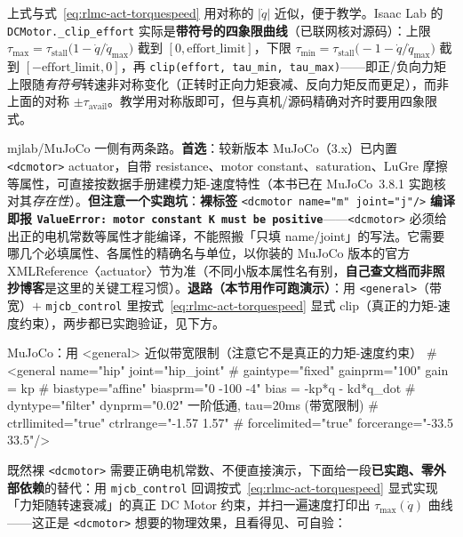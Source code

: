 \noindent{}上式与式~\eqref{eq:rlmc-act-torquespeed} 用对称的 $|\dot q|$ 近似，便于教学。Isaac Lab 的 \verb|DCMotor._clip_effort| 实际是\textbf{带符号的四象限曲线}（已联网核对源码）：上限 $\tau_{\max}=\tau_{\mathrm{stall}}\big(1-\dot q/\dot q_{\max}\big)$ 截到 $[0,\text{effort\_limit}]$，下限 $\tau_{\min}=\tau_{\mathrm{stall}}\big(-1-\dot q/\dot q_{\max}\big)$ 截到 $[-\text{effort\_limit},0]$，再 \verb|clip(effort, tau_min, tau_max)|——即正/负向力矩上限随\emph{有符号}转速非对称变化（正转时正向力矩衰减、反向力矩反而更足），而非上面的对称 $\pm\tau_{\mathrm{avail}}$。教学用对称版即可，但与真机/源码精确对齐时要用四象限式。

mjlab/MuJoCo 一侧有两条路。\textbf{首选}：较新版本 MuJoCo（3.x）已内置 \verb|<dcmotor>| actuator，自带 resistance、motor constant、saturation、LuGre 摩擦等属性，可直接按数据手册建模力矩-速度特性（本书已在 MuJoCo~3.8.1 实跑核对其\emph{存在性}）。\textbf{但注意一个实跑坑}：\textbf{裸标签} \verb|<dcmotor name="m" joint="j"/>| \textbf{编译即报 \texttt{ValueError: motor constant K must be positive}}——\verb|<dcmotor>| 必须给出正的电机常数等属性才能编译，不能照搬「只填 name/joint」的写法。它需要哪几个必填属性、各属性的精确名与单位，以你装的 MuJoCo 版本的官方 XMLReference〈actuator〉节为准（不同小版本属性名有别，\textbf{自己查文档而非照抄博客}是这里的关键工程习惯）。\textbf{退路（本节用作可跑演示）}：用 \verb|<general>|（带宽）$+$ \verb|mjcb_control| 里按式~\eqref{eq:rlmc-act-torquespeed} 显式 clip（真正的力矩-速度约束），两步都已实跑验证，见下方。

\begin{codebox}[Python]{MuJoCo：用 <general> 近似带宽限制（注意它不是真正的力矩-速度约束）}
# <general name="hip" joint="hip_joint"
#          gaintype="fixed" gainprm="100"        gain = kp
#          biastype="affine" biasprm="0 -100 -4"  bias = -kp*q - kd*q_dot
#          dyntype="filter" dynprm="0.02"         一阶低通, tau=20ms (带宽限制)
#          ctrllimited="true" ctrlrange="-1.57 1.57"
#          forcelimited="true" forcerange="-33.5 33.5"/>
\end{codebox}

\noindent 既然裸 \verb|<dcmotor>| 需要正确电机常数、不便直接演示，下面给一段\textbf{已实跑、零外部依赖}的替代：用 \verb|mjcb_control| 回调按式~\eqref{eq:rlmc-act-torquespeed} 显式实现「力矩随转速衰减」的真正 DC Motor 约束，并扫一遍速度打印出 $\tau_{\max}(\dot q)$ 曲线——这正是 \verb|<dcmotor>| 想要的物理效果，且看得见、可自验：

